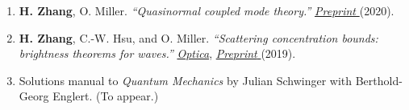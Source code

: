 \documentclass[11pt]{article}
\begin{document}
\begin{enumerate}[leftmargin=1.5em, itemsep=0.6em]
		
		\item \textbf{H. Zhang}, O. Miller. \textit{“Quasinormal coupled mode theory.”}  \href{https://arxiv.org/abs/2010.08650}{\color{blue} \emph{Preprint} }(2020).
		
		\item \textbf{H. Zhang}, C.-W. Hsu, and O. Miller. \textit{“Scattering concentration bounds: brightness theorems for waves.”} \href{https://opg.optica.org/optica/fulltext.cfm?uri=optica-6-10-1321}{\color{blue}  \emph{Optica}},    \href{https://arxiv.org/abs/1810.02727}{\color{blue} \emph{Preprint} }(2019).
		
		\item Solutions manual to \textit{Quantum Mechanics} by Julian Schwinger with Berthold-Georg Englert. (To appear.)
		
	\end{enumerate}
	
\end{document}
